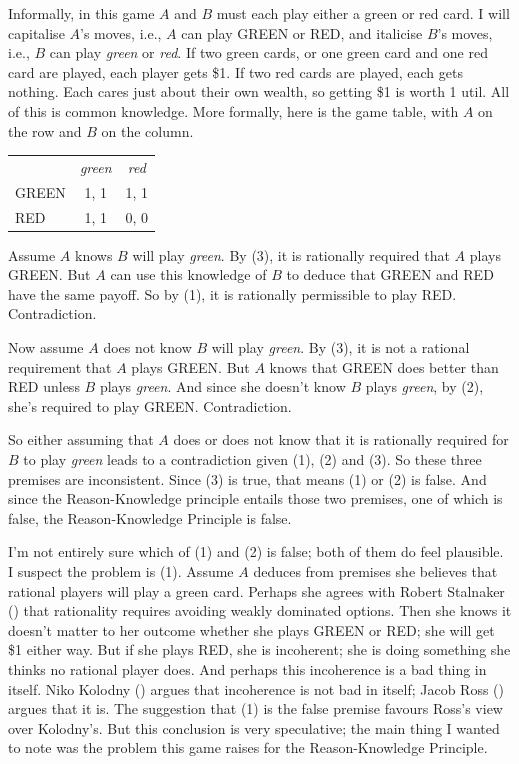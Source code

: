 \documentclass[
  11pt,
  letterpaper,
  DIV=11,
  numbers=noendperiod,
  twoside]{scrartcl}
\newcounter{none} %
\begin{document}
Informally, in this game \(A\) and \(B\) must each play either a green
or red card. I will capitalise \(A\)'s moves, i.e., \(A\) can play GREEN
or RED, and italicise \(B\)'s moves, i.e., \(B\) can play \emph{green}
or \emph{red}. If two green cards, or one green card and one red card
are played, each player gets \$1. If two red cards are played, each gets
nothing. Each cares just about their own wealth, so getting \$1 is worth
1 util. All of this is common knowledge. More formally, here is the game
table, with \(A\) on the row and \(B\) on the column.

{\def\LTcaptype{none} %
\begin{longtable}[]{@{}lcc@{}}
\toprule\noalign{}
\endhead
\bottomrule\noalign{}
\endlastfoot
& \emph{green} & \emph{red} \\
GREEN & 1, 1 & 1, 1 \\
RED & 1, 1 & 0, 0 \\
\end{longtable}
}

Assume \(A\) knows \(B\) will play \emph{green}. By (3), it is
rationally required that \(A\) plays GREEN. But \(A\) can use this
knowledge of \(B\) to deduce that GREEN and RED have the same payoff. So
by (1), it is rationally permissible to play RED. Contradiction.

Now assume \(A\) does not know \(B\) will play \emph{green}. By (3), it
is not a rational requirement that \(A\) plays GREEN. But \(A\) knows
that GREEN does better than RED unless \(B\) plays \emph{green}. And
since she doesn't know \(B\) plays \emph{green}, by (2), she's required
to play GREEN. Contradiction.

So either assuming that \(A\) does or does not know that it is
rationally required for \(B\) to play \emph{green} leads to a
contradiction given (1), (2) and (3). So these three premises are
inconsistent. Since (3) is true, that means (1) or (2) is false. And
since the Reason-Knowledge principle entails those two premises, one of
which is false, the Reason-Knowledge Principle is false.

I'm not entirely sure which of (1) and (2) is false; both of them do
feel plausible. I suspect the problem is (1). Assume \(A\) deduces from
premises she believes that rational players will play a green card.
Perhaps she agrees with Robert Stalnaker
() that rationality requires avoiding
weakly dominated options. Then she knows it doesn't matter to her
outcome whether she plays GREEN or RED; she will get \$1 either way. But
if she plays RED, she is incoherent; she is doing something she thinks
no rational player does. And perhaps this incoherence is a bad thing in
itself. Niko Kolodny () argues that
incoherence is not bad in itself; Jacob Ross
() argues that it is. The suggestion that
(1) is the false premise favours Ross's view over Kolodny's. But this
conclusion is very speculative; the main thing I wanted to note was the
problem this game raises for the Reason-Knowledge Principle.
\end{document}

